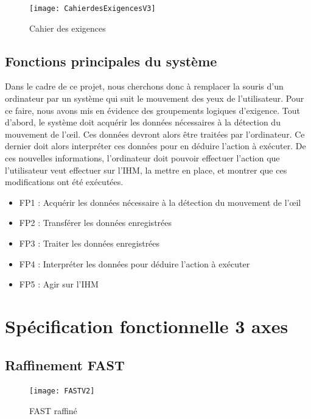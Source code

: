\begin{figure}[H]
  \centering
  \texttt{[image: CahierdesExigencesV3]}
  \caption{Cahier des exigences}
  \label{fig:exigences}
\end{figure}

\section{Fonctions principales du système}

Dans le cadre de ce projet, nous cherchons donc à remplacer la souris d'un ordinateur par un système qui suit le mouvement des yeux de l'utilisateur. Pour ce faire, nous avons mis en évidence des groupements logiques d'exigence. Tout d'abord, le système doit acquérir les données nécessaires à la détection du mouvement de l'œil. Ces données devront alors être traitées par l'ordinateur. Ce dernier doit alors interpréter ces données pour en déduire l'action à exécuter. De ces nouvelles informations, l'ordinateur doit pouvoir effectuer l'action que l'utilisateur veut effectuer sur l'IHM, la mettre en place, et montrer que ces modifications ont été exécutées. 

\begin{itemize}[label=\textbullet,font=\color{black}]
\item FP1 : Acquérir les données nécessaire à la détection du mouvement de l'œil 
\item\colorbox{sable}{FP2 : Transférer les données enregistrées}
\item FP3 : Traiter les données enregistrées 
\item FP4 : Interpréter les données pour déduire l'action à exécuter 
\item FP5 : Agir sur l'IHM 
\end{itemize}

\chapter{Spécification fonctionnelle  3 axes}

\section{Raffinement FAST}

\begin{figure}[H]
  \centering
  \texttt{[image: FASTV2]}
  \caption{FAST raffiné}
  \label{fig:FAST}
\end{figure}

